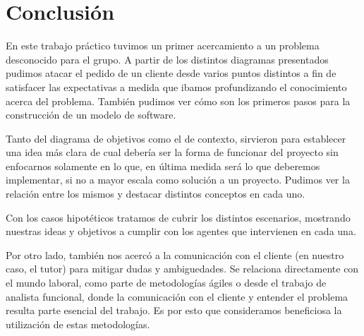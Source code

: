 \documentclass[spanish, 10pt,a4paper]{article}
\numberwithin{equation}{section} %
\begin{document}
\section{Conclusión}
	En este trabajo práctico tuvimos un primer acercamiento a un problema desconocido para el grupo. A partir de los distintos diagramas presentados pudimos atacar el pedido de un cliente desde varios puntos distintos a fin de satisfacer las expectativas a medida que ibamos profundizando el conocimiento acerca del problema. También pudimos ver cómo son los primeros pasos para la construcción de un modelo de software.
	
	Tanto del diagrama de objetivos como el de contexto, sirvieron para establecer una idea más clara de cual debería ser la forma de funcionar del proyecto sin enfocarnos solamente en lo que, en última medida será lo que deberemos implementar, si no a mayor escala como solución a un proyecto. Pudimos ver la relación entre los mismos y destacar distintos conceptos en cada uno.

	Con los casos hipotéticos tratamos de cubrir los distintos escenarios, mostrando nuestras ideas y objetivos a cumplir con los agentes que intervienen en cada una.
	
	Por otro lado, también nos acercó a la comunicación con el cliente (en nuestro caso, el tutor) para mitigar dudas y ambiguedades. Se relaciona directamente con el mundo laboral, como parte de metodologías ágiles o desde el trabajo de analista funcional, donde la comunicación con el cliente y entender el problema resulta parte esencial del trabajo. Es por esto que consideramos beneficiosa la utilización de estas metodologías.

\end{document}

